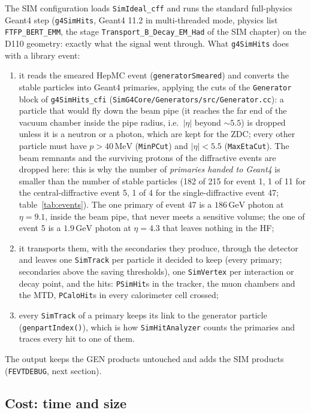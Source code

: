 \documentclass[11pt,a4paper]{article}
\newcommand{\code}[1]{\texttt{#1}}
\newcommand{\GeV}{\,\mathrm{GeV}}
\newcommand{\MeV}{\,\mathrm{MeV}}
\begin{document}
The SIM configuration loads \code{SimIdeal\_cff} and runs the standard full-physics Geant4 step
(\code{g4SimHits}, Geant4 11.2 in multi-threaded mode, physics list \code{FTFP\_BERT\_EMM}, the stage
\code{Transport\_B\_Decay\_EM\_Had} of the SIM chapter) on the D110 geometry: exactly what the signal went
through. What \code{g4SimHits} does with a library event:
\begin{enumerate}
\item it reads the smeared HepMC event (\code{generatorSmeared}) and converts the stable particles into
  Geant4 primaries, applying the cuts of the \code{Generator} block of \code{g4SimHits\_cfi}
  (\code{SimG4Core/Generators/src/Generator.cc}): a particle that would fly down the beam pipe (it reaches
  the far end of the vacuum chamber inside the pipe radius, i.e.\ $|\eta|$ beyond $\sim5.5$) is dropped
  unless it is a neutron or a photon, which are kept for the ZDC; every other particle must have
  $p>40\MeV$ (\code{MinPCut}) and $|\eta|<5.5$ (\code{MaxEtaCut}). The beam remnants and the surviving
  protons of the diffractive events are dropped here: this is why the number of \emph{primaries handed to
  Geant4} is smaller than the number of stable particles (182 of 215 for event 1, 1 of 11 for the
  central-diffractive event 5, 1 of 4 for the single-diffractive event 47; table~\ref{tab:events}). The one
  primary of event 47 is a $186\GeV$ photon at $\eta=9.1$, inside the beam pipe, that never meets a
  sensitive volume; the one of event 5 is a $1.9\GeV$ photon at $\eta=4.3$ that leaves nothing in the HF;
\item it transports them, with the secondaries they produce, through the detector and leaves one
  \code{SimTrack} per particle it decided to keep (every primary; secondaries above the saving thresholds),
  one \code{SimVertex} per interaction or decay point, and the hits: \code{PSimHit}s in the tracker, the muon
  chambers and the MTD, \code{PCaloHit}s in every calorimeter cell crossed;
\item every \code{SimTrack} of a primary keeps its link to the generator particle (\code{genpartIndex()}),
  which is how \code{SimHitAnalyzer} counts the primaries and traces every hit to one of them.
\end{enumerate}
The output keeps the GEN products untouched and adds the SIM products (\code{FEVTDEBUG}, next section).

\subsection{Cost: time and size}
\label{sec:cost}
\end{document}
